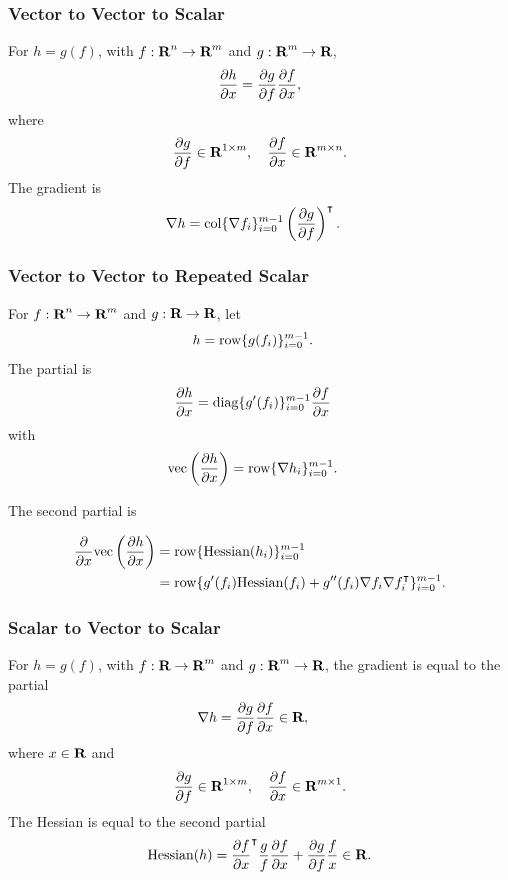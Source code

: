 \documentclass{article}
\begin{document}
        \subsubsection{Vector to Vector to Scalar}
        For $h=g(f)$, with $f:\textbf{R}^n\to\textbf{R}^m$ and $g:\textbf{R}^m\to\textbf{R}$,
        \begin{align*}
            \frac{\partial h}{\partial x}=\frac{\partial g}{\partial f}\frac{\partial f}{\partial x},
        \end{align*}
        where 
        \begin{align*}
            \frac{\partial g}{\partial f}\in\textbf{R}^{1\times m}, \quad 
            \frac{\partial f}{\partial x}\in\textbf{R}^{m\times n}.
        \end{align*}
        The gradient is
        \begin{align*}
            \nabla h
            &
            =\text{col}\{\nabla f_i\}_{i=0}^{m-1} \left(\frac{\partial g}{\partial f}\right)^\intercal.
        \end{align*}

    
    \subsubsection{Vector to Vector to Repeated Scalar}
        For $f:\textbf{R}^n\to\textbf{R}^m$ and $g:\textbf{R}\to\textbf{R}$, let
        \begin{align*}
            h&=\text{row}\{g(f_i)\}_{i=0}^{m-1}.
        \end{align*}
        The partial is
        \begin{align*}
            \frac{\partial h}{\partial x}&=\text{diag}\{g'(f_i)\}_{i=0}^{m-1}\frac{\partial f}{\partial x}
        \end{align*}
        with
        \begin{align*}
            \mathrm{vec}\left(\frac{\partial h}{\partial x}\right)&=\text{row}\{\nabla h_i\}_{i=0}^{m-1}.
        \end{align*}
    
        The second partial is

        \begin{align*}
            \frac{\partial }{\partial x}\mathrm{vec}\left(\frac{\partial h}{\partial x}\right)&=\text{row}\{\text{Hessian}(h_i)\}_{i=0}^{m-1}\\
            &=\text{row}\{g'(f_i)\text{Hessian}(f_i)+g''(f_i)\nabla f_i\nabla f_i^\intercal\}_{i=0}^{m-1}.
        \end{align*}

    \subsubsection{Scalar to Vector to Scalar}
        For $h=g(f)$, with $f:\textbf{R}\to\textbf{R}^m$ and $g:\textbf{R}^m\to\textbf{R}$,
        the gradient is equal to the partial
        \begin{align*}
            \nabla h&=\frac{\partial g}{\partial f}\frac{\partial f}{\partial x}\in\textbf{R},
        \end{align*}
        where $x\in\textbf{R}$ and
        \begin{align*}
            \frac{\partial g}{\partial f}\in\textbf{R}^{1\times m},\quad
            \frac{\partial f}{\partial x}\in\textbf{R}^{m\times 1}.
        \end{align*}
        The Hessian is equal to the second partial
        \begin{align*}
            \text{Hessian}(h)
            =\frac{\partial f}{\partial x}^\intercal\frac{ g}{ f}\frac{\partial f}{\partial x}
                +\frac{\partial g}{\partial f}\frac{ f}{ x}\in\textbf{R}.
        \end{align*}
\end{document}
